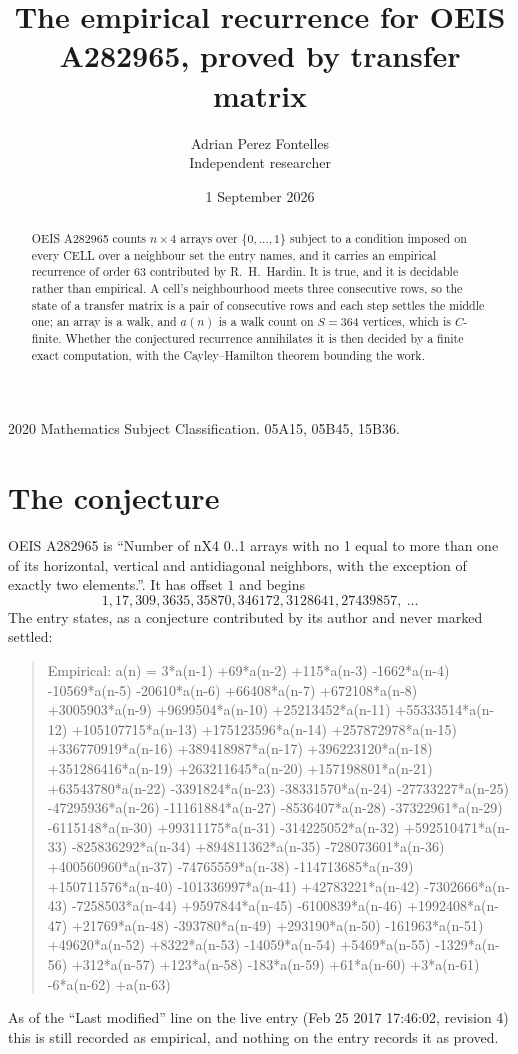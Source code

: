 \documentclass[11pt,a4paper]{article}
\title{The empirical recurrence for OEIS A282965, proved by transfer matrix}
\author{Adrian Perez Fontelles\\ \small Independent researcher}
\date{1 September 2026}
\theoremstyle{plain}
\theoremstyle{definition}
\begin{document}
\maketitle

\begin{abstract}
OEIS A282965 counts $n\times4$ arrays over $\{0,\dots,1\}$ subject to a condition imposed on
every CELL over a neighbour set the entry names, and it carries an empirical recurrence of
order $63$ contributed by R.~H.~Hardin. It is true, and it is decidable rather than
empirical. A cell's neighbourhood meets three consecutive rows, so the state of a transfer
matrix is a pair of consecutive rows and each step settles the middle one; an array is a
walk, and $a(n)$ is a walk count on $S=364$ vertices, which is $C$-finite. Whether the
conjectured recurrence annihilates it is then decided by a finite exact computation, with the
Cayley--Hamilton theorem bounding the work.
\end{abstract}

\noindent\small 2020 Mathematics Subject Classification. 05A15, 05B45, 15B36.\normalsize

\section{The conjecture}

OEIS A282965 is ``Number of nX4 0..1 arrays with no 1 equal to more than one of its horizontal, vertical and antidiagonal neighbors, with the exception of exactly two elements.''. It has offset $1$ and begins
\[
1, 17, 309, 3635, 35870, 346172, 3128641, 27439857,\ \dots
\]
The entry states, as a conjecture contributed by its author and never marked settled:
\begin{quote}
Empirical: a(n) = 3*a(n-1) +69*a(n-2) +115*a(n-3) -1662*a(n-4) -10569*a(n-5) -20610*a(n-6) +66408*a(n-7) +672108*a(n-8) +3005903*a(n-9) +9699504*a(n-10) +25213452*a(n-11) +55333514*a(n-12) +105107715*a(n-13) +175123596*a(n-14) +257872978*a(n-15) +336770919*a(n-16) +389418987*a(n-17) +396223120*a(n-18) +351286416*a(n-19) +263211645*a(n-20) +157198801*a(n-21) +63543780*a(n-22) -3391824*a(n-23) -38331570*a(n-24) -27733227*a(n-25) -47295936*a(n-26) -11161884*a(n-27) -8536407*a(n-28) -37322961*a(n-29) -6115148*a(n-30) +99311175*a(n-31) -314225052*a(n-32) +592510471*a(n-33) -825836292*a(n-34) +894811362*a(n-35) -728073601*a(n-36) +400560960*a(n-37) -74765559*a(n-38) -114713685*a(n-39) +150711576*a(n-40) -101336997*a(n-41) +42783221*a(n-42) -7302666*a(n-43) -7258503*a(n-44) +9597844*a(n-45) -6100839*a(n-46) +1992408*a(n-47) +21769*a(n-48) -393780*a(n-49) +293190*a(n-50) -161963*a(n-51) +49620*a(n-52) +8322*a(n-53) -14059*a(n-54) +5469*a(n-55) -1329*a(n-56) +312*a(n-57) +123*a(n-58) -183*a(n-59) +61*a(n-60) +3*a(n-61) -6*a(n-62) +a(n-63)
\end{quote}
As of the ``Last modified'' line on the live entry (Feb 25 2017 17:46:02, revision 4) this is still
recorded as empirical, and nothing on the entry records it as proved.
\end{document}
